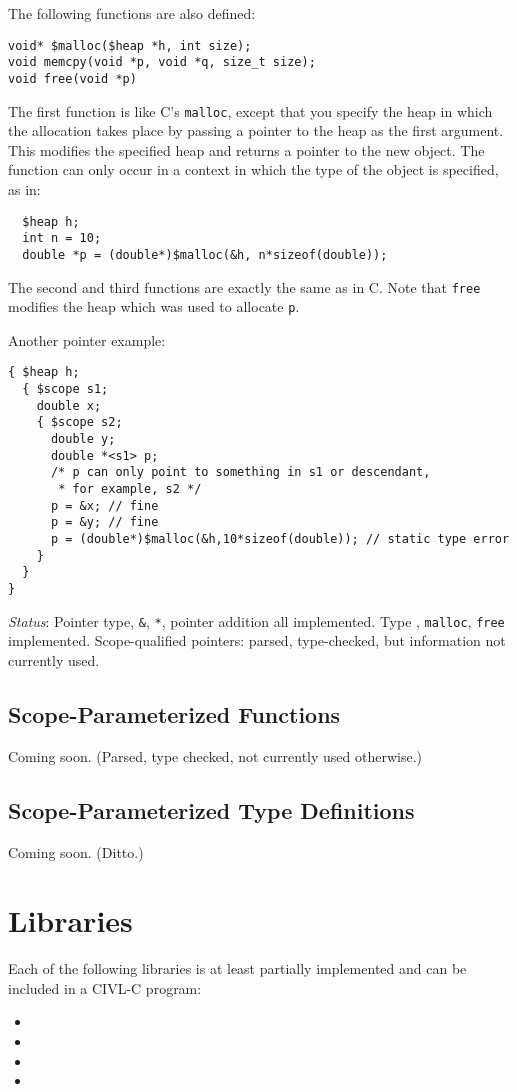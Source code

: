 The following functions are also defined:
\begin{verbatim}
void* $malloc($heap *h, int size);
void memcpy(void *p, void *q, size_t size);
void free(void *p)
\end{verbatim}
The first function is like C's \texttt{malloc}, except that you
specify the heap in which the allocation takes place by passing a
pointer to the heap as the first argument.  This modifies the
specified heap and returns a pointer to the new object.  The function
can only occur in a context in which the type of the object is
specified, as in:
\begin{verbatim}
  $heap h;
  int n = 10;
  double *p = (double*)$malloc(&h, n*sizeof(double));
\end{verbatim}
The second and third functions are exactly the same as in C. Note that
\texttt{free} modifies the heap which was used to allocate \texttt{p}.

Another pointer example:
\begin{small}
\begin{verbatim}
{ $heap h;
  { $scope s1;
    double x;
    { $scope s2;
      double y;
      double *<s1> p;
      /* p can only point to something in s1 or descendant,
       * for example, s2 */
      p = &x; // fine
      p = &y; // fine
      p = (double*)$malloc(&h,10*sizeof(double)); // static type error
    }
  }
}
\end{verbatim}
\end{small}

\emph{Status}: Pointer type, \texttt{\&}, \texttt{*}, pointer addition
all implemented.  Type \cheap{}, \texttt{malloc}, \texttt{free}
implemented.  Scope-qualified pointers: parsed, type-checked, but
information not currently used.

\section{Scope-Parameterized Functions}

Coming soon.  (Parsed, type checked, not currently used otherwise.)

\section{Scope-Parameterized Type Definitions}

Coming soon. (Ditto.)

\chapter{Libraries}

Each of the following libraries is at least partially implemented and can
be included in a CIVL-C program:
\begin{itemize}
\item {}
\item {}
\item {}
\item {}
\end{itemize}
